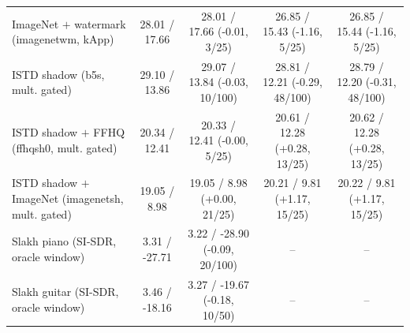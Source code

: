 \begin{table}[t]
\begin{tabular}{@{}lcccc@{}}
        ImageNet $+$ watermark (imagenetwm, kApp) & 28.01 / 17.66 & 28.01 / 17.66 (-0.01, 3/25) & 26.85 / 15.43 (-1.16, 5/25) & 26.85 / 15.44 (-1.16, 5/25) \\
        ISTD shadow (b5s, mult. gated) & 29.10 / 13.86 & 29.07 / 13.84 (-0.03, 10/100) & 28.81 / 12.21 (-0.29, 48/100) & 28.79 / 12.20 (-0.31, 48/100) \\
        ISTD shadow $+$ FFHQ (ffhqsh0, mult. gated) & 20.34 / 12.41 & 20.33 / 12.41 (-0.00, 5/25) & 20.61 / 12.28 (+0.28, 13/25) & 20.62 / 12.28 (+0.28, 13/25) \\
        ISTD shadow $+$ ImageNet (imagenetsh, mult. gated) & 19.05 / 8.98 & 19.05 / 8.98 (+0.00, 21/25) & 20.21 / 9.81 (+1.17, 15/25) & 20.22 / 9.81 (+1.17, 15/25) \\
        Slakh piano (SI-SDR, oracle window) & 3.31 / -27.71 & 3.22 / -28.90 (-0.09, 20/100) & -- & -- \\
        Slakh guitar (SI-SDR, oracle window) & 3.46 / -18.16 & 3.27 / -19.67 (-0.18, 10/50) & -- & -- \\
        \bottomrule
    \end{tabular}
\end{table}
